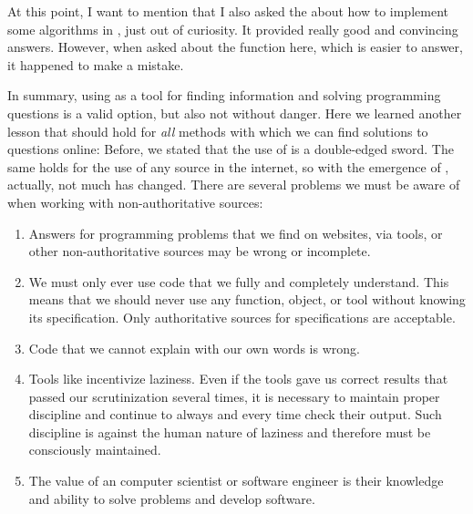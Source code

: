 \begin{noglslink}
At this point, I want to mention that I also asked the  about how to implement some algorithms in \python, just out of curiosity.
It provided really good and convincing answers.
However, when asked about the  function here, which is easier to answer, it happened to make a mistake.

In summary, using  as a tool for finding information and solving programming questions is a valid option, but also not without danger.
Here we learned another lesson that should hold for \emph{all} methods with which we can find solutions to questions online:%
%
%
%
Before, we stated that the use of  is a double-edged sword.
The same holds for the use of any source in the internet, so with the emergence of , actually, not much has changed.
There are several problems we must be aware of when working with non-authoritative sources:%
%
\begin{enumerate}%
%
\item Answers for programming problems that we find on websites, via  tools, or other non-authoritative sources may be wrong or incomplete.%
%
\item We must only ever use code that we fully and completely understand. %
This means that we should never use any function, object, or tool without knowing its specification. %
Only authoritative sources for specifications are acceptable.%
%
\item Code that we cannot explain with our own words is wrong.%
%
\item Tools like  incentivize laziness. %
Even if the tools gave us correct results that passed our scrutinization several times, it is necessary to maintain proper discipline and continue to always and every time check their output. %
Such discipline is against the human nature of laziness and therefore must be consciously maintained.%
%
\item The value of an computer scientist or software engineer is their knowledge and ability to solve problems and develop software. %

\end{enumerate}
\end{noglslink}
